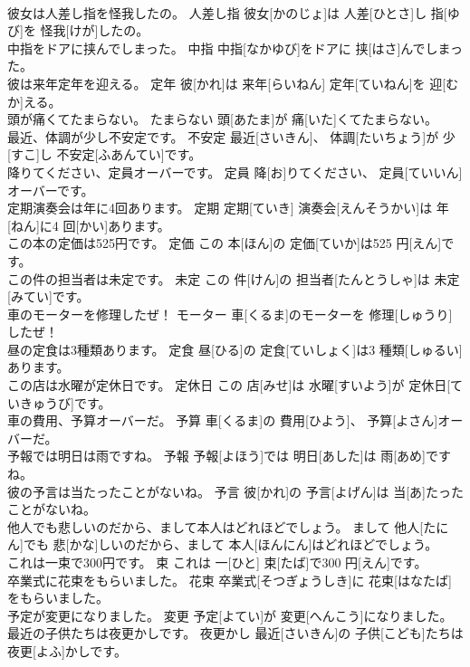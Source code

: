 \documentclass[8pt]{extreport}
\begin{document}
\begin{CJK}{UTF8}{min}
\\	彼女は人差し指を怪我したの。	人差し指	彼女[かのじょ]は 人差[ひとさ]し 指[ゆび]を 怪我[けが]したの。	
\\	中指をドアに挟んでしまった。	中指	中指[なかゆび]をドアに 挟[はさ]んでしまった。	
\\	彼は来年定年を迎える。	定年	彼[かれ]は 来年[らいねん] 定年[ていねん]を 迎[むか]える。	
\\	頭が痛くてたまらない。	たまらない	頭[あたま]が 痛[いた]くてたまらない。	
\\	最近、体調が少し不安定です。	不安定	最近[さいきん]、 体調[たいちょう]が 少[すこ]し 不安定[ふあんてい]です。	
\\	降りてください、定員オーバーです。	定員	降[お]りてください、 定員[ていいん]オーバーです。	
\\	定期演奏会は年に4回あります。	定期	定期[ていき] 演奏会[えんそうかい]は 年[ねん]に4 回[かい]あります。	
\\	この本の定価は525円です。	定価	この 本[ほん]の 定価[ていか]は525 円[えん]です。	
\\	この件の担当者は未定です。	未定	この 件[けん]の 担当者[たんとうしゃ]は 未定[みてい]です。	
\\	車のモーターを修理したぜ！	モーター	車[くるま]のモーターを 修理[しゅうり]したぜ！	
\\	昼の定食は3種類あります。	定食	昼[ひる]の 定食[ていしょく]は3 種類[しゅるい]あります。	
\\	この店は水曜が定休日です。	定休日	この 店[みせ]は 水曜[すいよう]が 定休日[ていきゅうび]です。	
\\	車の費用、予算オーバーだ。	予算	車[くるま]の 費用[ひよう]、 予算[よさん]オーバーだ。	
\\	予報では明日は雨ですね。	予報	予報[よほう]では 明日[あした]は 雨[あめ]ですね。	
\\	彼の予言は当たったことがないね。	予言	彼[かれ]の 予言[よげん]は 当[あ]たったことがないね。	
\\	他人でも悲しいのだから、まして本人はどれほどでしょう。	まして	他人[たにん]でも 悲[かな]しいのだから、まして 本人[ほんにん]はどれほどでしょう。	
\\	これは一束で300円です。	束	これは 一[ひと] 束[たば]で300 円[えん]です。	
\\	卒業式に花束をもらいました。	花束	卒業式[そつぎょうしき]に 花束[はなたば]をもらいました。	
\\	予定が変更になりました。	変更	予定[よてい]が 変更[へんこう]になりました。	
\\	最近の子供たちは夜更かしです。	夜更かし	最近[さいきん]の 子供[こども]たちは 夜更[よふ]かしです。	

\end{CJK}
\end{document}
